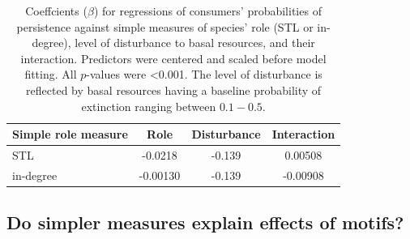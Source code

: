 \documentclass[12pt]{article}
\begin{document}
\begin{spacing}{2.0}
        \begin{table}[hb!]
            \caption{Coeffcients ($\beta$) for regressions of consumers' probabilities of persistence against simple measures of species' role (STL or in-degree), level of disturbance to basal resources, and their interaction. Predictors were centered and scaled before model fitting. All $p$-values were \textless0.001. The level of disturbance is reflected by basal resources having a baseline probability of extinction ranging between $0.1 - 0.5$.}
            \label{tab:per_vs_TLdeg}
            \centering
            \begin{tabular}{l|c  c  c |}
                Simple role measure & Role & Disturbance & Interaction \\
                \hline
                STL & -0.0218 & -0.139 & 0.00508 \\
                in-degree & -0.00130 & -0.139 & -0.00908 \\
            \end{tabular}
        \end{table}
        
        
    
    \clearpage
    
    \subsection*{Do simpler measures explain effects of motifs?}


\end{spacing}
\end{document}
